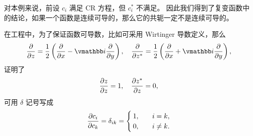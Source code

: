 {对本例来说，前设 $c_i$ 满足 CR 方程，但 $c_i^*$ 不满足。
因此我们得到了复变函数中的结论，如果一个函数是连续可导的，那么它的共轭一定不是连续可导的。

在工程中，为了保证函数可导数，比如可采用 Wirtinger 导数定义，那么
\begin{align}
    \pdv{z} = \frac12 \left(\pdv{x} - \ii \pdv{y}\right), 
    \quad
    \pdv{z^*} = \frac12\left(\pdv{x}+\ii \pdv{y}\right),
\end{align}
证明了
\begin{align}
    \pdv{z}{z} = 1, \quad \pdv{z^*}{z} = 0,
\end{align}
可用 $\delta$ 记号写成
\begin{align}
    \pdv{c_i}{c_k} = \delta_{ik} = \begin{cases}
        1, \quad &i=k,\\
        0, \quad &i\neq k. 
    \end{cases}
\end{align}
}

